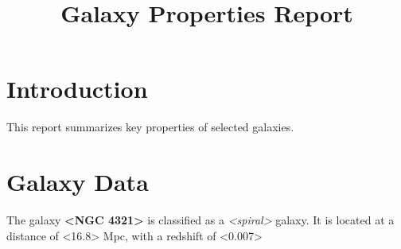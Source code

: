 \documentclass{article}
\title{Galaxy Properties Report}
\author{}
\date{}
\begin{document}
\maketitle

\section{Introduction}
This report summarizes key properties of selected galaxies.

\section{Galaxy Data}
The galaxy \textbf{<NGC 4321>} is classified as a \textit{<spiral>} galaxy. 
It is located at a distance of <16.8> Mpc, with a redshift of <0.007>
\end{document}
